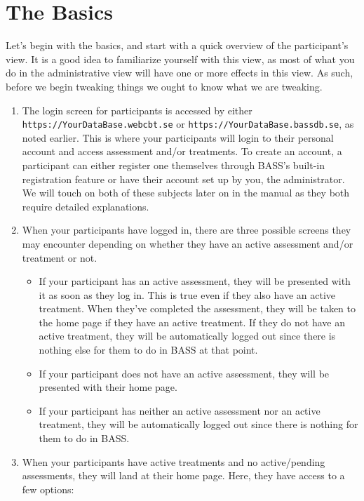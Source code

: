 \documentclass[]{book}
\providecommand{\tightlist}{%
  \setlength{\itemsep}{0pt}\setlength{\parskip}{0pt}}
\begin{document}
\hypertarget{the-basics}{%
\chapter{The Basics}\label{the-basics}}

Let's begin with the basics, and start with a quick overview of the participant's view. It is a good idea to familiarize yourself with this view, as most of what you do in the administrative view will have one or more effects in this view. As such, before we begin tweaking things we ought to know what we are tweaking.

\begin{enumerate}
\def\labelenumi{\arabic{enumi}.}
\tightlist
\item
  The login screen for participants is accessed by either \texttt{https://YourDataBase.webcbt.se} or \texttt{https://YourDataBase.bassdb.se}, as noted earlier. This is where your participants will login to their personal account and access assessment and/or treatments. To create an account, a participant can either register one themselves through BASS's built-in registration feature or have their account set up by you, the administrator. We will touch on both of these subjects later on in the manual as they both require detailed explanations.
\item
  When your participants have logged in, there are three possible screens they may encounter depending on whether they have an active assessment and/or treatment or not.

  \begin{itemize}
  \tightlist
  \item
    If your participant has an active assessment, they will be presented with it as soon as they log in. This is true even if they also have an active treatment. When they've completed the assessment, they will be taken to the home page if they have an active treatment. If they do not have an active treatment, they will be automatically logged out since there is nothing else for them to do in BASS at that point.
  \item
    If your participant does not have an active assessment, they will be presented with their home page.
  \item
    If your participant has neither an active assessment nor an active treatment, they will be automatically logged out since there is nothing for them to do in BASS.
  \end{itemize}
\item
  When your participants have active treatments and no active/pending assessments, they will land at their home page. Here, they have access to a few options:


\end{enumerate}
\end{document}
